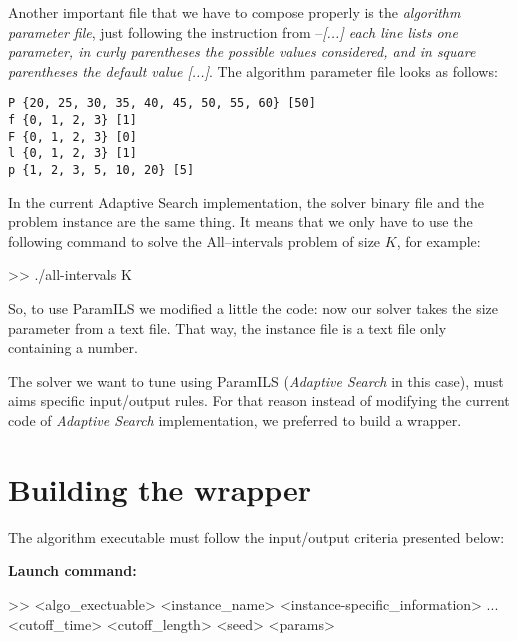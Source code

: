 Another important file that we have to compose properly is the {\it algorithm parameter file}, just following the instruction from \cite{Hutter2008} --\textit{[...] each line lists one parameter, in curly parentheses the possible values considered, and in square parentheses the default value [...]}. The algorithm parameter file looks as follows:\\

\begin{shadedbox}
	\texttt{P \{20, 25, 30, 35, 40, 45, 50, 55, 60\} [50]\\
		f \{0, 1, 2, 3\} [1]\\
		F \{0, 1, 2, 3\} [0]\\
		l \{0, 1, 2, 3\} [1]\\
		p \{1, 2, 3, 5, 10, 20\} [5]
	}
\end{shadedbox}

In the current Adaptive Search implementation, the solver binary file and the problem instance are the same thing. It means that we only have to use the following command to solve the All--intervals problem of size $K$, for example: 

\begin{BGVerbatim}
>> ./all-intervals K
\end{BGVerbatim}

So, to use {\sc ParamILS} we modified a little the code: now our solver takes the size parameter from a text file. That way, the instance file is a text file only containing a number.

The solver we want to tune using {\sc ParamILS} ({\it Adaptive Search} in this case), must aims specific input/output rules. For that reason instead of modifying the current code of {\it Adaptive Search} implementation, we preferred to build a wrapper.

\section{Building the wrapper}

The algorithm executable must follow the input/output criteria presented below: 

\textbf{\large Launch command:} 

\begin{BGVerbatim}
>> <algo_exectuable> <instance_name> <instance-specific_information> ...
<cutoff_time> <cutoff_length> <seed> <params>
\end{BGVerbatim}

